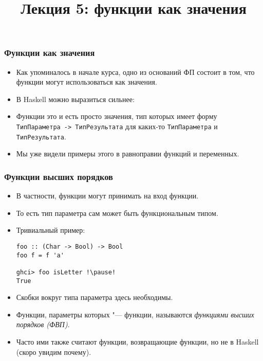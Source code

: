 \documentclass[10pt]{beamer}
\title{Лекция 5: функции как значения}
\begin{document}
\begin{frame}[plain]
  \maketitle
\end{frame}

\begin{frame}[fragile]
  \frametitle{Функции как значения}
  \begin{itemize}
    \item Как упоминалось в начале курса, одно из оснований ФП состоит в том, что функции могут использоваться как значения.
    \item В Haskell можно выразиться сильнее:\pause
    \item Функции это и есть просто значения, тип которых имеет форму \lstinline|ТипПараметра -> ТипРезультата| для каких-то \lstinline|ТипПараметра| и \lstinline|ТипРезультата|.\pause
    \item Мы уже видели примеры этого в равноправии функций и переменных.
  \end{itemize}
\end{frame}

\begin{frame}[fragile]
  \frametitle{Функции высших порядков}
  \begin{itemize}
    \item В частности, функции могут принимать на вход функции.
    \item То есть тип параметра сам может быть функциональным типом.
    \item Тривиальный пример:
          \begin{lstlisting}
foo :: (Char -> Bool) -> Bool
foo f = f 'a'

ghci> foo isLetter !\pause!
True
\end{lstlisting}
    \item Скобки вокруг типа параметра здесь необходимы.\pause
    \item Функции, параметры которых "--- функции, называются \emph{функциями высших порядков (ФВП)}.\pause
    \item Часто ими также считают функции, возвращающие функции, но не в Haskell (скоро увидим почему).
  \end{itemize}
\end{frame}
\end{document}
